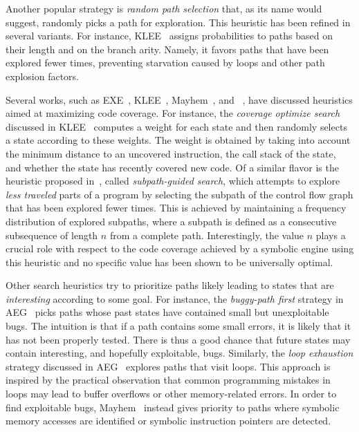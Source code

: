 Another popular strategy is {\em random path selection} that, as its name would suggest, randomly picks a path for exploration. This heuristic has been refined in several variants. For instance, {\sc KLEE}~\cite{KLEE-OSDI08} assigns probabilities to paths based on their length and on the branch arity. Namely, it favors paths that have been explored fewer times, preventing starvation caused by loops and other path explosion factors.

Several works, such as {\sc EXE}~\cite{EXE-CCS06}, {\sc KLEE}~\cite{KLEE-OSDI08}, {\sc Mayhem}~\cite{MAYHEM-SP12}, and {\sc \stwoe}~\cite{CKC-TOCS12}, have discussed heuristics aimed at maximizing code coverage. For instance, the {\em coverage optimize search} discussed in {\sc KLEE}~\cite{KLEE-OSDI08} computes a weight for each state and then randomly selects a state according to these weights. The weight is obtained by taking into account the minimum distance to an uncovered instruction, the call stack of the state, and whether the state has recently covered new code. Of a similar flavor is the heuristic proposed in~\cite{LZL-OOPSLA13}, called {\em subpath-guided search}, which attempts to explore {\it less traveled} parts of a program by selecting the subpath of the control flow graph that has been explored fewer times. This is achieved by maintaining a frequency distribution of explored subpaths, where a subpath is defined as a consecutive subsequence of length $n$ from a complete path. Interestingly, the value $n$ plays a crucial role with respect to the code coverage achieved by a symbolic engine using this heuristic and no specific value has been shown to be universally optimal.

Other search heuristics try to prioritize paths likely leading to states that are {\em interesting} according to some goal. For instance, the {\em buggy-path first} strategy in {\sc AEG}~\cite{AEG-NDSS11} picks paths whose past states have contained small but unexploitable bugs. The intuition is that if a path contains some small errors, it is likely that it has not been properly tested. There is thus a good chance that future states may contain interesting, and hopefully exploitable, bugs. Similarly, the {\em loop exhaustion} strategy discussed in {\sc AEG}~\cite{AEG-NDSS11} explores paths that visit loops. This approach is inspired by the practical observation that common programming mistakes in loops may lead to buffer overflows or other memory-related errors. In order to find exploitable bugs, {\sc Mayhem}~\cite{MAYHEM-SP12} instead gives priority to paths where symbolic memory accesses are identified or symbolic instruction pointers are detected. 

